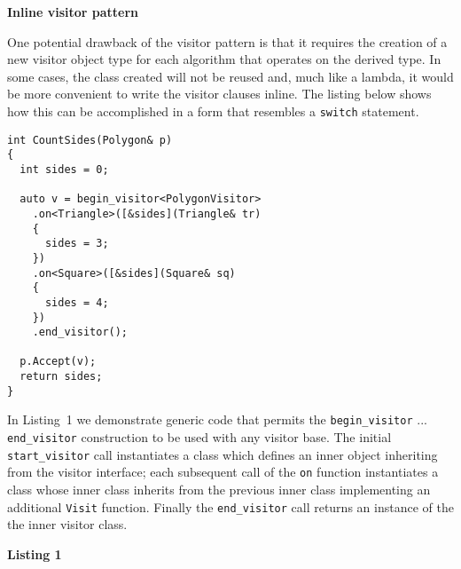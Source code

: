 \documentclass[10pt,a4paper]{article}
\renewcommand\section[1]{
    \begin{minipage}[c]{0.94\linewidth}
    \large \raggedright \sffamily \textbf{#1}
    \end{minipage}
}
\renewcommand\subsection[1]{
    \begin{minipage}[c]{0.94\linewidth}
    \raggedright \sffamily \textbf{#1}
    \end{minipage}
}
\newcommand\mycode[1]{{\small\texttt{#1}}}
\begin{document}
\newpage

\section{Inline visitor pattern}

One potential drawback of the visitor pattern is that it requires the creation
of a new visitor object type for each algorithm that operates on the derived
type. In some cases, the class created will not be reused and, much like a
lambda, it would be more convenient to write the visitor clauses inline. The
listing below shows how this can be accomplished in a form that resembles a
\mycode{switch} statement.

{\small\begin{verbatim} 
int CountSides(Polygon& p) 
{ 
  int sides = 0;
  
  auto v = begin_visitor<PolygonVisitor> 
    .on<Triangle>([&sides](Triangle& tr) 
    {
      sides = 3; 
    }) 
    .on<Square>([&sides](Square& sq) 
    { 
      sides = 4; 
    }) 
    .end_visitor();
  
  p.Accept(v); 
  return sides; 
} \end{verbatim}}

In Listing~1 we demonstrate generic code that permits the
\mycode{begin\_visitor} ... \mycode{end\_visitor} construction to be used with
any visitor base. The initial \mycode{start\_visitor} call instantiates a class
which defines an inner object inheriting from the visitor interface; each
subsequent call of the \mycode{on} function instantiates a class whose inner
class inherits from the previous inner class implementing an additional
\mycode{Visit} function.  Finally the \mycode{end\_visitor} call returns an
instance of the the inner visitor class.

\subsection{Listing 1}
\end{document}
